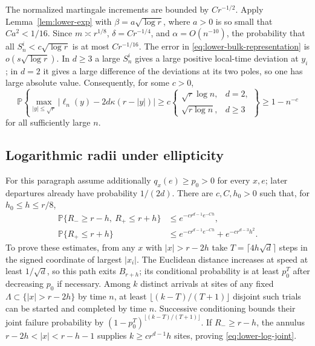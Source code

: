 The normalized martingale increments are bounded by $Cr^{-1/2}$.
Apply Lemma~\ref{lem:lower-exp} with
$\beta=a\sqrt{\log r}$, where $a>0$ is so small that
$Ca^2<1/16$.  Since $m\asymp r^{1/8}$,
$\delta=Cr^{-1/4}$, and $\alpha=O(n^{-10})$, the probability
that all $S_n^i<c\sqrt{\log r}$ is at most $Cr^{-1/16}$.
The error in \eqref{eq:lower-bulk-representation} is
$o(s\sqrt{\log r})$.  In $d\geq3$ a large $S_n^i$ gives a large
positive local-time deviation at $y_i$; in $d=2$ it gives a large
difference of the deviations at its two poles, so one has large
absolute value.  Consequently, for some $c>0$,
\begin{equation}\label{eq:lower-bulk-max}
 \mathbb P\left\{\max_{|y|\leq\sqrt r}
 |\ell_n(y)-2d\kappa(r-|y|)|\geq
 c\begin{cases}\sqrt r\log n,&d=2,\\\sqrt{r\log n},&d\geq3
   \end{cases}\right\}\geq1-n^{-c}
\end{equation}
for all sufficiently large $n$.

\subsection{Logarithmic radii under ellipticity}

For this paragraph assume additionally $q_x(e)\geq p_0>0$
for every $x,e$; later departures already have probability $1/(2d)$.
There are $c,C,h_0>0$ such that, for $h_0\leq h\leq r/8$,
\begin{align}
 \mathbb P\{R_-\geq r-h,\ R_+\leq r+h\}
   &\leq e^{-cr^{d-1}e^{-Ch}},\label{eq:lower-log-joint}\\
 \mathbb P\{R_+\leq r+h\}
   &\leq e^{-cr^{d-1}e^{-Ch}}+e^{-cr^{d-3}h^2}.
       \label{eq:lower-log-outer}
\end{align}
To prove these estimates, from any $x$ with $|x|>r-2h$ take
$T=\lceil4h\sqrt d\rceil$ steps in the signed coordinate of
largest $|x_i|$.  The Euclidean distance increases at speed at least
$1/\sqrt d$, so this path exits $B_{r+h}$; its conditional
probability is at least $p_0^T$ after decreasing $p_0$ if necessary.
Among $k$ distinct arrivals at sites of any fixed
$\Lambda\subset\{|x|>r-2h\}$ by time $n$, at least
$\lfloor(k-T)/(T+1)\rfloor$ disjoint such trials can be started
and completed by time $n$.  Successive conditioning bounds their
joint failure probability by
$(1-p_0^T)^{\lfloor(k-T)/(T+1)\rfloor}$.
If $R_-\geq r-h$, the annulus
$r-2h<|x|<r-h-1$ supplies $k\geq cr^{d-1}h$ sites, proving
\eqref{eq:lower-log-joint}.

